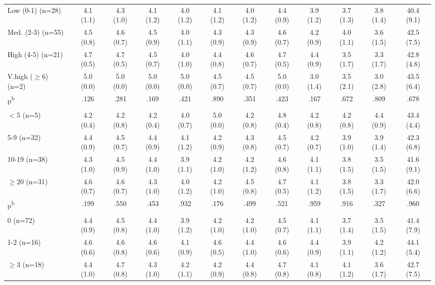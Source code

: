\begin{landscape}
\begin{table}[htbp]
\begin{threeparttable}
\begin{tabular}{@{}l@{\hspace{3pt}}c|c|c|c|c|c|c|c|c|c@{\hspace{3pt}}c@{}}
Low (0-1) (n=28) & 4.1 (1.1) & 4.3 (1.0) & 4.1 (1.2) & 4.0 (1.2) & 4.1 (1.2) & 4.0 (1.2) & 4.4 (0.9) & 3.9 (1.2) & 3.7 (1.3) & 3.8 (1.4) & 40.4 (9.1) \\
Med. (2-3) (n=55) & 4.5 (0.8) & 4.6 (0.7) & 4.5 (0.9) & 4.0 (1.1) & 4.3 (0.9) & 4.3 (0.9) & 4.6 (0.7) & 4.2 (0.9) & 4.0 (1.1) & 3.6 (1.5) & 42.5 (7.5) \\
High (4-5) (n=21) & 4.7 (0.5) & 4.7 (0.5) & 4.5 (0.7) & 4.0 (1.0) & 4.4 (0.8) & 4.6 (0.7) & 4.7 (0.5) & 4.4 (0.9) & 3.5 (1.7) & 3.3 (1.7) & 42.8 (4.8) \\
V.high ($\geq$6) (n=2) & 5.0 (0.0) & 5.0 (0.0) & 5.0 (0.0) & 5.0 (0.0) & 4.5 (0.7) & 4.5 (0.7) & 5.0 (0.0) & 3.0 (1.4) & 3.5 (2.1) & 3.0 (2.8) & 43.5 (6.4) \\
  p\textsuperscript{b} & .126 & .281 & .169 & .421 & .890 & .351 & .423 & .167 & .672 & .809 & .678 \\[0.5pt]
\addlinespace[1pt]
\multicolumn{12}{@{}l}{\textit{\scriptsize Cigarettes/Day}} \\
$<$5 (n=5) & 4.2 (0.4) & 4.2 (0.8) & 4.2 (0.4) & 4.0 (0.7) & 5.0 (0.0) & 4.2 (0.8) & 4.8 (0.4) & 4.2 (0.8) & 4.2 (0.8) & 4.4 (0.9) & 43.4 (4.4) \\
5-9 (n=32) & 4.4 (0.9) & 4.5 (0.7) & 4.4 (0.9) & 4.1 (1.2) & 4.2 (0.9) & 4.3 (0.8) & 4.5 (0.7) & 4.2 (0.7) & 3.9 (1.0) & 3.9 (1.4) & 42.3 (6.8) \\
10-19 (n=38) & 4.3 (1.0) & 4.5 (0.9) & 4.4 (1.0) & 3.9 (1.1) & 4.2 (1.0) & 4.2 (1.2) & 4.6 (0.8) & 4.1 (1.1) & 3.8 (1.5) & 3.5 (1.5) & 41.6 (9.1) \\
$\geq$20 (n=31) & 4.6 (0.7) & 4.6 (0.7) & 4.3 (1.0) & 4.0 (1.2) & 4.2 (1.0) & 4.5 (0.8) & 4.7 (0.5) & 4.1 (1.2) & 3.8 (1.5) & 3.3 (1.7) & 42.0 (6.6) \\
  p\textsuperscript{b} & .199 & .550 & .453 & .932 & .176 & .499 & .521 & .959 & .916 & .327 & .960 \\[0.5pt]
\addlinespace[1pt]
\multicolumn{12}{@{}l}{\textit{\scriptsize Quit Attempts}} \\
0 (n=72) & 4.4 (0.9) & 4.5 (0.8) & 4.4 (1.0) & 3.9 (1.2) & 4.2 (1.0) & 4.2 (1.0) & 4.5 (0.7) & 4.1 (1.1) & 3.7 (1.4) & 3.5 (1.5) & 41.4 (7.9) \\
1-2 (n=16) & 4.6 (0.6) & 4.6 (0.8) & 4.6 (0.6) & 4.1 (0.9) & 4.6 (0.5) & 4.4 (1.0) & 4.6 (0.6) & 4.4 (0.9) & 3.9 (1.1) & 4.2 (1.2) & 44.1 (5.4) \\
$\geq$3 (n=18) & 4.4 (1.0) & 4.7 (0.8) & 4.3 (1.0) & 4.2 (1.1) & 4.2 (0.9) & 4.4 (0.8) & 4.7 (0.8) & 4.1 (0.8) & 4.1 (1.2) & 3.6 (1.7) & 42.7 (7.5) \\

\end{tabular}
\end{threeparttable}
\end{table}
\end{landscape}
